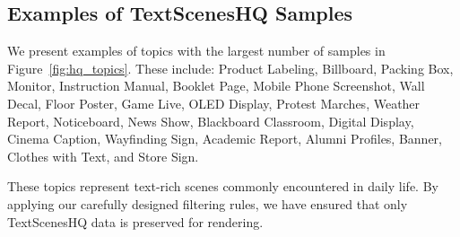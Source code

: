 



\subsection{Examples of TextScenesHQ Samples}

We present examples of topics with the largest number of samples in Figure~\ref{fig:hq_topics}. These include:  
Product Labeling, Billboard, Packing Box, Monitor, Instruction Manual, Booklet Page, Mobile Phone Screenshot, Wall Decal, Floor Poster, Game Live, OLED Display, Protest Marches, Weather Report, Noticeboard, News Show, Blackboard Classroom, Digital Display, Cinema Caption, Wayfinding Sign, Academic Report, Alumni Profiles, Banner, Clothes with Text, and Store Sign.

These topics represent text-rich scenes commonly encountered in daily life. 
By applying our carefully designed filtering rules, we have ensured that only TextScenesHQ data is preserved for rendering.















% 
